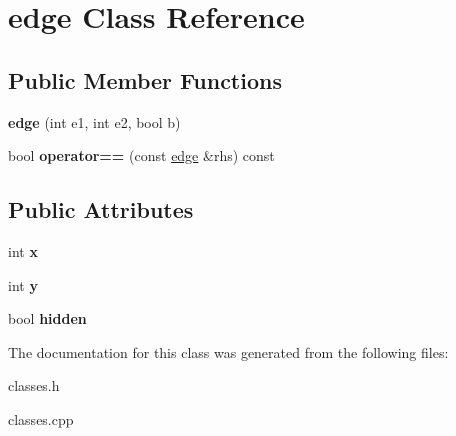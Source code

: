 \hypertarget{classedge}{}\section{edge Class Reference}
\label{classedge}
\subsection*{Public Member Functions}
\begin{DoxyCompactItemize}
\item 
\mbox{\label{classedge_a810a8bbcaa60304c654bd6bbfe1915b0}} 
{\bfseries edge} (int e1, int e2, bool b)
\item 
\mbox{\label{classedge_af6c75391caaee88d8ffb2331641eb531}} 
bool {\bfseries operator==} (const \mbox{\hyperlink{classedge}{edge}} \&rhs) const
\end{DoxyCompactItemize}
\subsection*{Public Attributes}
\begin{DoxyCompactItemize}
\item 
\mbox{\label{classedge_a08a065565db6999f12fd4498422e115c}} 
int {\bfseries x}
\item 
\mbox{\label{classedge_a24d6d9ad1d9309c0ce3b40c3dcd6b623}} 
int {\bfseries y}
\item 
\mbox{\label{classedge_a58e9f0be7697205f09966afeb70bd459}} 
bool {\bfseries hidden}
\end{DoxyCompactItemize}


The documentation for this class was generated from the following files\+:\begin{DoxyCompactItemize}
\item 
classes.\+h\item 
classes.\+cpp\end{DoxyCompactItemize}
